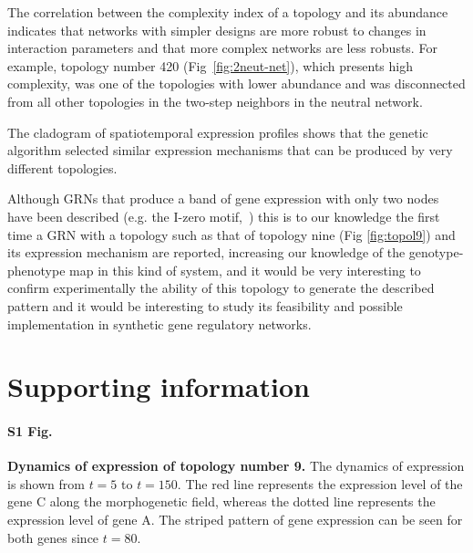 \documentclass[10pt,letterpaper]{article}
\begin{document}
The correlation between the complexity index of a topology and its abundance
indicates that networks with simpler designs are more robust to changes in
interaction parameters and that more complex networks are less robusts. For
example, topology number 420 (Fig~\ref{fig:2neut-net}), which
presents high complexity, was one of the
topologies with lower abundance and was disconnected from all other topologies
in the two-step neighbors in the neutral network.

The cladogram of spatiotemporal expression profiles shows that the genetic
algorithm selected similar expression mechanisms that can be produced by very
different topologies.

Although GRNs that produce a band of gene expression with only two nodes have
been described (e.g. the I-zero motif,~\cite{Schaerli2014}) this is to our
knowledge the first time a GRN with a topology such as that of topology nine
(Fig \ref{fig:topol9})
and its expression mechanism are reported, increasing our knowledge of the
genotype-phenotype map in this kind of system, and it would be very interesting
to confirm experimentally the ability of this topology to generate the described
pattern and it would be interesting to study its feasibility and possible
implementation in synthetic gene regulatory networks.



\section*{Supporting information}


\paragraph*{S1 Fig.}
\label{S1_Fig}
{\bf Dynamics of expression of topology number 9.}
The dynamics of expression is shown from $t = 5$ to $t = 150$. The red line
represents the expression level of the gene C along the morphogenetic field,
whereas the dotted line represents the expression level of gene A. The
striped pattern of gene expression can be seen for both genes since $t = 80$.
\end{document}
